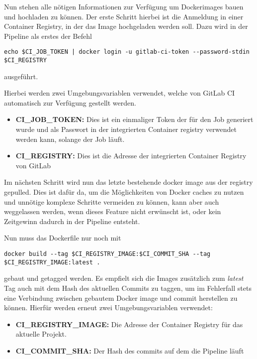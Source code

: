 Nun stehen alle nötigen Informationen zur Verfügung um Dockerimages bauen und hochladen zu können.
Der erste Schritt hierbei ist die Anmeldung in einer Container Registry, in der das Image hochgeladen werden soll.
Dazu wird in der Pipeline als erstes der Befehl
\begin{verbatim}
echo $CI_JOB_TOKEN | docker login -u gitlab-ci-token --password-stdin $CI_REGISTRY
\end{verbatim}
ausgeführt.

Hierbei werden zwei Umgebungsvariablen verwendet, welche von GitLab CI automatisch zur Verfügung gestellt werden. \cite{PredefinedVariablesReference}
\begin{itemize}
    \item \textbf{CI\_JOB\_TOKEN:} Dies ist ein einmaliger Token der für den Job generiert wurde und als Passwort in der integrierten Container registry verwendet werden kann, solange der Job läuft.
    \item \textbf{CI\_REGISTRY:} Dies ist die Adresse der integrierten Container Registry von GitLab
\end{itemize}

Im nächsten Schritt wird nun das letzte bestehende docker image aus der registry gepulled.
Dies ist dafür da, um die Möglichkeiten von Docker caches zu nutzen und unnötige komplexe Schritte vermeiden zu können, kann aber auch weggelassen werden, wenn dieses Feature nicht erwünscht ist, oder kein Zeitgewinn dadurch in der Pipeline entsteht.

Nun muss das Dockerfile nur noch mit
\begin{verbatim}
docker build --tag $CI_REGISTRY_IMAGE:$CI_COMMIT_SHA --tag $CI_REGISTRY_IMAGE:latest .
\end{verbatim}

gebaut und getagged werden.
Es empfielt sich die Images zusätzlich zum \textit{latest} Tag auch mit dem Hash des aktuellen Commits zu taggen, um im Fehlerfall stets eine Verbindung zwischen gebautem Docker image und commit herstellen zu können.
Hierfür werden erneut zwei Umgebungsvariablen verwendet:\cite{PredefinedVariablesReference}
\begin{itemize}
    \item \textbf{CI\_REGISTRY\_IMAGE:} Die Adresse der Container Registry für das aktuelle Projekt.
    \item \textbf{CI\_COMMIT\_SHA:} Der Hash des commits auf dem die Pipeline läuft
\end{itemize}

